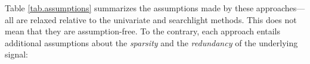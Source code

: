 %
%
%
%
%
%

Table \ref{tab.assumptions} summarizes the assumptions made by these approaches---all are relaxed relative to the univariate and searchlight methods. This does not mean that they are assumption-free. To the contrary, each approach entails additional assumptions about the {\em sparsity} and the {\em redundancy} of the underlying signal:

